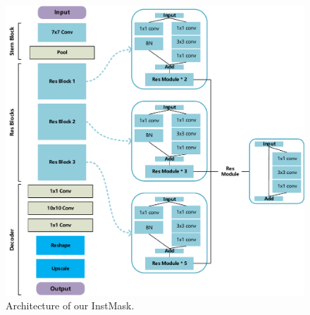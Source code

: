 \documentclass[review]{elsarticle}
\begin{document}
\begin{CJK*}{UTF8}{gbsn}
\begin{figure}
    \centering
    \includegraphics[width=12cm]{images/net.pdf}
    \caption{Architecture of our InstMask.}
    \label{fig:net}
\end{figure}


\end{CJK*}
\end{document}

